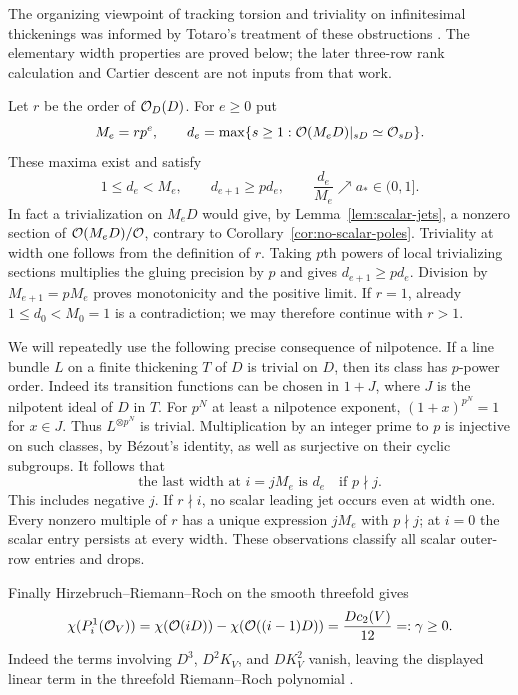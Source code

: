 The organizing viewpoint of tracking torsion and triviality on infinitesimal
thickenings was informed by Totaro's treatment of these obstructions
\cite[Lemma~4.1 and Section~6]{totaro2007}. The elementary width properties
are proved below; the later three-row rank calculation and Cartier descent
are not inputs from that work.

Let $r$ be the order of $\mathcal O_D(D)$. For $e\geq0$ put
\begin{equation}\label{eq:width-definition}
 M_e=rp^e,\qquad
 d_e=\max\{s\geq1:\mathcal O(M_eD)|_{sD}\simeq\mathcal O_{sD}\}.
\end{equation}
These maxima exist and satisfy
\begin{equation}\label{eq:width-bounds}
 1\leq d_e<M_e,\qquad d_{e+1}\geq p d_e,
 \qquad \frac{d_e}{M_e}\nearrow a_*\in(0,1].
\end{equation}
In fact a trivialization on $M_eD$ would give, by
Lemma~\ref{lem:scalar-jets}, a nonzero section of
$\mathcal O(M_eD)/\mathcal O$, contrary to
Corollary~\ref{cor:no-scalar-poles}. Triviality at width one
follows from the definition of $r$. Taking $p$th powers of
local trivializing sections multiplies the gluing precision
by $p$ and gives $d_{e+1}\geq pd_e$. Division by
$M_{e+1}=pM_e$ proves monotonicity and the positive limit.
If $r=1$, already $1\leq d_0<M_0=1$ is a contradiction;
we may therefore continue with $r>1$.

We will repeatedly use the following precise consequence of
nilpotence. If a line bundle $L$ on a finite thickening $T$
of $D$ is trivial on $D$, then its class has $p$-power order.
Indeed its transition functions can be chosen in $1+J$, where
$J$ is the nilpotent ideal of $D$ in $T$. For $p^N$ at least
a nilpotence exponent, $(1+x)^{p^N}=1$ for $x\in J$.
Thus $L^{\otimes p^N}$ is trivial. Multiplication by an
integer prime to $p$ is injective on such classes, by
B\'ezout's identity, as well as surjective on their cyclic
subgroups. It follows that
\begin{equation}\label{eq:scalar-last-width}
 \text{the last width at }i=jM_e\text{ is }d_e
 \quad\text{if }p\nmid j.
\end{equation}
This includes negative $j$. If $r\nmid i$, no scalar leading
jet occurs even at width one. Every nonzero multiple of $r$
has a unique expression $jM_e$ with $p\nmid j$; at $i=0$
the scalar entry persists at every width. These observations
classify all scalar outer-row entries and drops.

Finally Hirzebruch--Riemann--Roch on the smooth threefold gives
\begin{equation}\label{eq:scalar-euler}
 \chi(P_i^1(\mathcal O_V))
 =\chi(\mathcal O(iD))-\chi(\mathcal O((i-1)D))
 =\frac{Dc_2(V)}{12}=:\gamma\geq0.
\end{equation}
Indeed the terms involving $D^3$, $D^2K_V$, and $DK_V^2$
vanish, leaving the displayed linear term in the threefold
Riemann--Roch polynomial \cite[Section~15]{fulton1998}.

